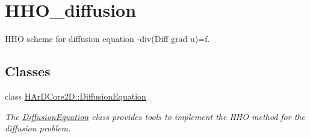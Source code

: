 \hypertarget{group__HHO__diffusion}{}\section{H\+H\+O\+\_\+diffusion}
\label{group__HHO__diffusion}


H\+HO scheme for diffusion equation -\/div(Diff grad u)=f.  


\subsection*{Classes}
\begin{DoxyCompactItemize}
\item 
class \hyperlink{classHArDCore2D_1_1DiffusionEquation}{H\+Ar\+D\+Core2\+D\+::\+Diffusion\+Equation}
\begin{DoxyCompactList}\small\item\em The \hyperlink{classHArDCore2D_1_1DiffusionEquation}{Diffusion\+Equation} class provides tools to implement the H\+HO method for the diffusion problem. \end{DoxyCompactList}\end{DoxyCompactItemize}
